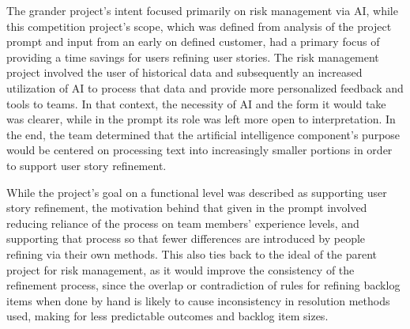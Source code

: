 The grander project’s intent focused primarily on risk management via AI, while this competition project’s scope, which was defined from analysis of the project prompt and input from an early on defined customer, had a primary focus of providing a time savings for users refining user stories. The risk management project involved the user of historical data and subsequently an increased utilization of AI to process that data and provide more personalized feedback and tools to teams. In that context, the necessity of AI and the form it would take was clearer, while in the prompt its role was left more open to interpretation. In the end, the team determined that the artificial intelligence component’s purpose would be centered on processing text into increasingly smaller portions in order to support user story refinement.

While the project’s goal on a functional level was described as supporting user story refinement, the motivation behind that given in the prompt involved reducing reliance of the process on team members’ experience levels, and supporting that process so that fewer differences are introduced by people refining via their own methods. This also ties back to the ideal of the parent project for risk management, as it would improve the consistency of the refinement process, since the overlap or contradiction of rules for refining backlog items when done by hand is likely to cause inconsistency in resolution methods used, making for less predictable outcomes and backlog item sizes.

